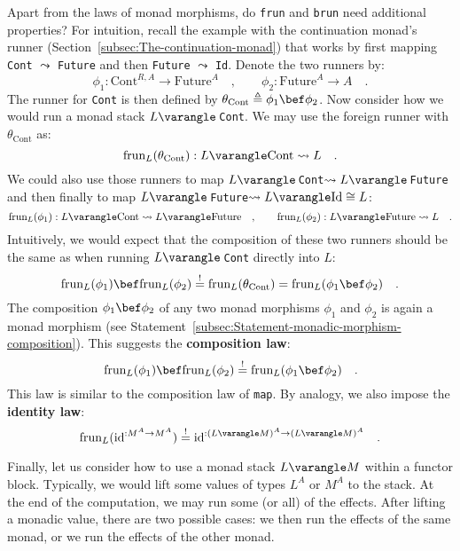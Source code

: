 Apart from the laws of monad morphisms, do \lstinline!frun! and \lstinline!brun!
need additional properties? For intuition, recall the example with
the continuation monad\textsf{'}s runner (Section~\ref{subsec:The-continuation-monad})
that works by first mapping \lstinline!Cont! $\leadsto$ \lstinline!Future!
and then \lstinline!Future! $\leadsto$ \lstinline!Id!. Denote the
two runners by:
\[
\phi_{1}:\text{Cont}^{R,A}\rightarrow\text{Future}^{A}\quad,\quad\quad\phi_{2}:\text{Future}^{A}\rightarrow A\quad.
\]
The runner for \lstinline!Cont! is then defined by $\theta_{\text{Cont}}\triangleq\phi_{1}\bef\phi_{2}$.
Now consider how we would run a monad stack $L\varangle\,$\lstinline!Cont!.
We may use the foreign runner with $\theta_{\text{Cont}}$ as:
\[
\text{frun}_{L}(\theta_{\text{Cont}}):L\varangle\text{Cont}\leadsto L\quad.
\]
We could also use those runners to map $L\varangle\,$\lstinline!Cont!$\leadsto L\varangle\,$\lstinline!Future!
and then finally to map $L\varangle\,$\lstinline!Future!$\leadsto L\varangle\text{Id}\cong L$:
\[
\text{frun}_{L}(\phi_{1}):L\varangle\text{Cont}\leadsto L\varangle\text{Future}\quad,\quad\quad\text{frun}_{L}(\phi_{2}):L\varangle\text{Future}\leadsto L\quad.
\]
Intuitively, we would expect that the composition of these two runners
should be the same as when running $L\varangle\,$\lstinline!Cont!
directly into $L$:
\[
\text{frun}_{L}(\phi_{1})\bef\text{frun}_{L}(\phi_{2})\overset{!}{=}\text{frun}_{L}(\theta_{\text{Cont}})=\text{frun}_{L}(\phi_{1}\bef\phi_{2})\quad.
\]
The composition $\phi_{1}\bef\phi_{2}$ of any two monad morphisms
$\phi_{1}$ and $\phi_{2}$ is again a monad morphism (see Statement~\ref{subsec:Statement-monadic-morphism-composition}).
This suggests the \textbf{composition law}:
\begin{equation}
\text{frun}_{L}(\phi_{1})\bef\text{frun}_{L}(\phi_{2})\overset{!}{=}\text{frun}_{L}(\phi_{1}\bef\phi_{2})\quad.\label{eq:composition-law-of-frun}
\end{equation}
This law is similar to the composition law of \lstinline!map!. By
analogy, we also impose the \textbf{identity law}:
\[
\text{frun}_{L}(\text{id}^{:M^{A}\rightarrow M^{A}})\overset{!}{=}\text{id}^{:(L\varangle M)^{A}\rightarrow(L\varangle M)^{A}}\quad.
\]

Finally, let us consider how to use a monad stack $L\varangle M$
within a functor block. Typically, we would lift some values of types
$L^{A}$ or $M^{A}$ to the stack. At the end of the computation,
we may run some (or all) of the effects. After lifting a monadic value,
there are two possible cases: we then run the effects of the same
monad, or we run the effects of the other monad. 

